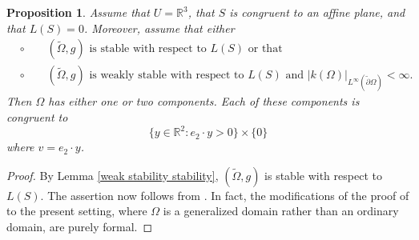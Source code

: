 \documentclass[11pt]{amsart}
\newtheorem{prop}{Proposition}
\begin{document}
\begin{prop} \label{half space}
	Assume that $U=\mathbb{R}^3$, that $S$ is congruent to an affine plane, and that $L(S)=0$. Moreover, assume that either
	\begin{align*}
		&\circ \qquad \text{$(\tilde\Omega,g)$ is stable with respect to $L(S)$ or that}\\
		&\circ \qquad \text{$(\tilde\Omega,g)$ is weakly stable with respect to $L(S)$ and  $|k(\Omega)|_{L^\infty(\tilde \partial \Omega)}<\infty$.} 
	\end{align*}
	  Then $\Omega$ has either one or two components. Each of these components is congruent to $$\{y\in \mathbb{R}^2:e_2\cdot y> 0\}\times\{0\}$$  where  $v=e_2\cdot y$. 
\end{prop}
\begin{proof}

	By Lemma \ref{weak stability stability}, $(\tilde\Omega,g)$ is stable with respect to $L(S)$. The assertion now  follows from  \cite[Theorem 3.1]{KamburovWang}. In fact, the modifications of the proof of \cite[Theorem 3.1]{KamburovWang} to the present setting, where $\Omega$ is a generalized domain rather than an ordinary domain, are purely formal.  
\end{proof}
\end{document}
